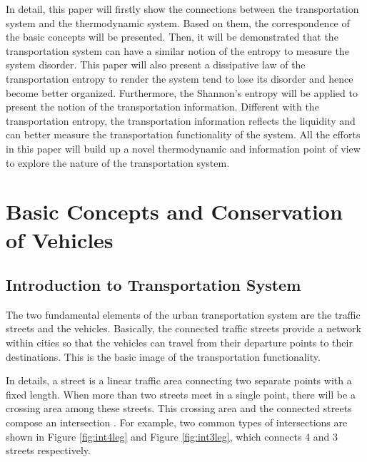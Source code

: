 \documentclass[preprint,authoryear,12pt]{elsarticle}
\begin{document}
In detail, this paper will firstly show the connections between the
transportation system and the thermodynamic system. Based on them, the
correspondence of the basic concepts will be presented. Then, it will
be demonstrated that the transportation system can have a similar
notion of the entropy to measure the system disorder. This paper will
also present a dissipative law of the transportation entropy to
render the system tend to lose its disorder and hence become better
organized. Furthermore, the Shannon's entropy will be applied to
present the notion of the transportation information. Different with
the transportation entropy, the transportation information reflects
the liquidity and can better measure the transportation functionality
of the system. All the efforts in this paper will build up a novel
thermodynamic and information point of view to explore the nature of
the transportation system.

\section{Basic Concepts and Conservation of Vehicles}

\subsection{Introduction to Transportation System}

The two fundamental elements of the urban transportation system are
the traffic streets and the vehicles. Basically, the connected
traffic streets provide a network within cities so that the vehicles
can travel from their departure points to their destinations. This is
the basic image of the transportation functionality.

In details, a street is a linear traffic area connecting two separate
points with a fixed length. When more than two streets meet in a
single point, there will be a crossing area among these streets. This
crossing area and the connected streets compose an intersection
\citep{papageorgiou_review_2003}. For example, two common types of
intersections are shown in Figure \ref{fig:int4leg} and Figure
\ref{fig:int3leg}, which connects 4 and 3 streets respectively.
\end{document}
